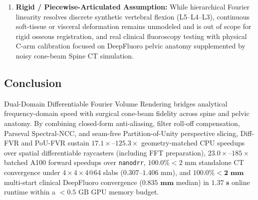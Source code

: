 \documentclass[journal]{IEEEtran}
\begin{document}
\begin{enumerate}
    \item \textbf{Rigid / Piecewise-Articulated Assumption:} While hierarchical Fourier linearity resolves discrete synthetic vertebral flexion (L5--L4--L3), continuous soft-tissue or visceral deformation remains unmodeled and is out of scope for rigid osseous registration, and real clinical fluoroscopy testing with physical C-arm calibration focused on DeepFluoro pelvic anatomy supplemented by noisy cone-beam Spine CT simulation.
\end{enumerate}

\subsection{Conclusion}
Dual-Domain Differentiable Fourier Volume Rendering bridges analytical frequency-domain speed with surgical cone-beam fidelity across spine and pelvic anatomy. By combining closed-form anti-aliasing, filter roll-off compensation, Parseval Spectral-NCC, and seam-free Partition-of-Unity perspective slicing, Diff-FVR and PoU-FVR sustain $17.1\times$--$125.3\times$ geometry-matched CPU speedups over spatial differentiable raycasters (including FFT preparation), $23.0\times$--$185\times$ batched A100 forward speedups over \texttt{nanodrr}, $100.0\% <2\text{ mm}$ standalone CT convergence under $4{\times}4{\times}4@64$ slabs ($0.307\text{--}1.406\text{ mm}$), and $\mathbf{100.0\% <2\text{ mm}}$ multi-start clinical DeepFluoro convergence ($\mathbf{0.835\text{ mm}}$ median) in $\mathbf{1.37\text{ s}}$ online runtime within a $<0.5\text{ GB}$ GPU memory budget.
\end{document}
